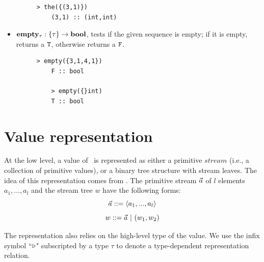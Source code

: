 \begin{itemize}
\begin{figure}[H]
\begin{lstlisting}[style = nesl-style]
	> the({(3,1)})
	(3,1) :: (int,int)
	\end{lstlisting}
	\end{figure}
	
	\item $\mathbf{empty_{\tau}:  \{\tau\} \rightarrow \mathbf{bool}}$, tests if the given sequence is empty; if it is empty, returns a $\mathtt{T}$, otherwise returns a $\mathtt{F}$.
	\begin{figure}[H]
	\begin{example}
	\end{example}
	\begin{lstlisting}[style = nesl-style]
	> empty({3,1,4,1})
	F :: bool
	
	> empty({}int)
	T :: bool
	\end{lstlisting}
	\end{figure}
\end{itemize}



\section{Value representation} \label{sec:valrep}
At the low level, a value of \mysnesl \ is represented as either a primitive $stream$ (i.e., a collection of primitive values),
or a binary tree structure with stream leaves. 
The idea of this representation comes from \cite{Blel90vecmod}. 
The primitive stream $\vec a$ of $l$ elements $a_1,...,a_l$ and the stream tree $w$ have the following forms: 
$$ \a ::= \<a_1,...,a_l\'>$$
$$ w ::= \a \ | \ (w_1,w_2) $$

The representation also relies on the high-level type of the value. 
We use the infix symbol ``$ \triangleright$" subscripted by a type $\tau$ to denote a type-dependent representation relation.


